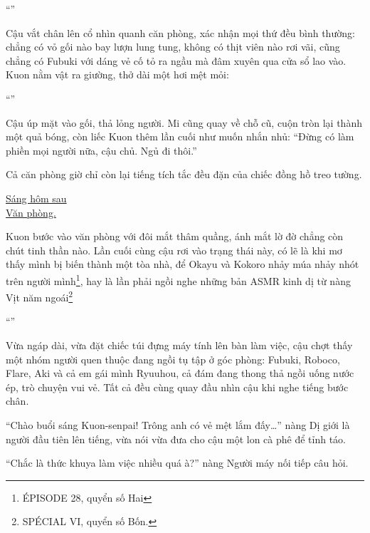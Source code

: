 \documentclass[../main.tex]{subfiles}
\begin{document}
``''

Cậu vắt chân lên cổ nhìn quanh căn phòng, xác nhận mọi thứ đều bình thường: chẳng có vỏ gối nào bay lượn lung tung, không có thịt viên nào rơi vãi, cũng chẳng có Fubuki với dáng vẻ cố tỏ ra ngầu mà đâm xuyên qua cửa sổ lao vào. Kuon nằm vật ra giường, thở dài một hơi mệt mỏi:

``''

Cậu úp mặt vào gối, thả lỏng người. Mi cũng quay về chỗ cũ, cuộn tròn lại thành một quả bóng, còn liếc Kuon thêm lần cuối như muốn nhắn nhủ: ``Đừng có làm phiền mọi người nữa, cậu chủ. Ngủ đi thôi.''

Cả căn phòng giờ chỉ còn lại tiếng tích tắc đều đặn của chiếc đồng hồ treo tường.

\begin{center}
  \uline{Sáng hôm sau\\Văn phòng.}
\end{center}

Kuon bước vào văn phòng với đôi mắt thâm quầng, ánh mắt lờ đờ chẳng còn chút tinh thần nào. Lần cuối cùng cậu rơi vào trạng thái này, có lẽ là khi mơ thấy mình bị biến thành một tòa nhà, để Okayu và Kokoro nhảy múa nhảy nhót trên người mình\footnote{{\flaregothic ÉPISODE 28}, quyển số Hai}, hay là lần phải ngồi nghe những bản ASMR kinh dị từ nàng Vịt năm ngoái\footnote{{\flaregothic SPÉCIAL \ab VI}, quyển số Bốn.}

``''

Vừa ngáp dài, vừa đặt chiếc túi đựng máy tính lên bàn làm việc, cậu chợt thấy một nhóm người quen thuộc đang ngồi tụ tập ở góc phòng: Fubuki, Roboco, Flare, Aki và cả em gái mình Ryuuhou, cả đám đang thong thả ngồi uống nước ép, trò chuyện vui vẻ. Tất cả đều cùng quay đầu nhìn cậu khi nghe tiếng bước chân.

``Chào buổi sáng Kuon-senpai! Trông anh có vẻ mệt lắm đấy\dots'' nàng Dị giới là người đầu tiên lên tiếng, vừa nói vừa đưa cho cậu một lon cà phê để tỉnh táo.

``Chắc là thức khuya làm việc nhiều quá à?'' nàng Người máy nối tiếp câu hỏi.
\end{document}
